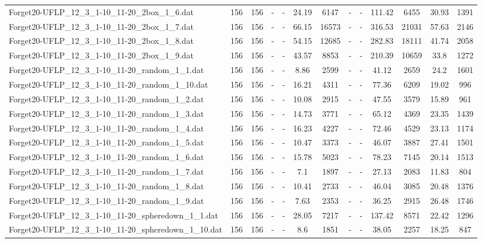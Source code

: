 \begin{table}[!ht]
{\begin{tabular}{lcccccccccccc}
Forget20-UFLP\_12\_3\_1-10\_11-20\_2box\_1\_6.dat & 156 & 156 &  - &  - & 24.19 & 6147 &  - &  - & 111.42 & 6455 & 30.93 & 1391 \\
Forget20-UFLP\_12\_3\_1-10\_11-20\_2box\_1\_7.dat & 156 & 156 &  - &  - & 66.15 & 16573 &  - &  - & 316.53 & 21031 & 57.63 & 2146 \\
Forget20-UFLP\_12\_3\_1-10\_11-20\_2box\_1\_8.dat & 156 & 156 &  - &  - & 54.15 & 12685 &  - &  - & 282.83 & 18111 & 41.74 & 2058 \\
Forget20-UFLP\_12\_3\_1-10\_11-20\_2box\_1\_9.dat & 156 & 156 &  - &  - & 43.57 & 8853 &  - &  - & 210.39 & 10659 & 33.8 & 1272 \\
Forget20-UFLP\_12\_3\_1-10\_11-20\_random\_1\_1.dat & 156 & 156 &  - &  - & 8.86 & 2599 &  - &  - & 41.12 & 2659 & 24.2 & 1601 \\
Forget20-UFLP\_12\_3\_1-10\_11-20\_random\_1\_10.dat & 156 & 156 &  - &  - & 16.21 & 4311 &  - &  - & 77.36 & 6209 & 19.02 & 996 \\
Forget20-UFLP\_12\_3\_1-10\_11-20\_random\_1\_2.dat & 156 & 156 &  - &  - & 10.08 & 2915 &  - &  - & 47.55 & 3579 & 15.89 & 961 \\
Forget20-UFLP\_12\_3\_1-10\_11-20\_random\_1\_3.dat & 156 & 156 &  - &  - & 14.73 & 3771 &  - &  - & 65.12 & 4369 & 23.35 & 1439 \\
Forget20-UFLP\_12\_3\_1-10\_11-20\_random\_1\_4.dat & 156 & 156 &  - &  - & 16.23 & 4227 &  - &  - & 72.46 & 4529 & 23.13 & 1174 \\
Forget20-UFLP\_12\_3\_1-10\_11-20\_random\_1\_5.dat & 156 & 156 &  - &  - & 10.47 & 3373 &  - &  - & 46.07 & 3887 & 27.41 & 1501 \\
Forget20-UFLP\_12\_3\_1-10\_11-20\_random\_1\_6.dat & 156 & 156 &  - &  - & 15.78 & 5023 &  - &  - & 78.23 & 7145 & 20.14 & 1513 \\
Forget20-UFLP\_12\_3\_1-10\_11-20\_random\_1\_7.dat & 156 & 156 &  - &  - & 7.1 & 1897 &  - &  - & 27.13 & 2083 & 11.83 & 804 \\
Forget20-UFLP\_12\_3\_1-10\_11-20\_random\_1\_8.dat & 156 & 156 &  - &  - & 10.41 & 2733 &  - &  - & 46.04 & 3085 & 20.48 & 1376 \\
Forget20-UFLP\_12\_3\_1-10\_11-20\_random\_1\_9.dat & 156 & 156 &  - &  - & 7.63 & 2353 &  - &  - & 36.25 & 2915 & 26.48 & 1746 \\
Forget20-UFLP\_12\_3\_1-10\_11-20\_spheredown\_1\_1.dat & 156 & 156 &  - &  - & 28.05 & 7217 &  - &  - & 137.42 & 8571 & 22.42 & 1296 \\
Forget20-UFLP\_12\_3\_1-10\_11-20\_spheredown\_1\_10.dat & 156 & 156 &  - &  - & 8.6 & 1851 &  - &  - & 38.05 & 2257 & 18.25 & 847 \\

\end{tabular}}
\end{table}
